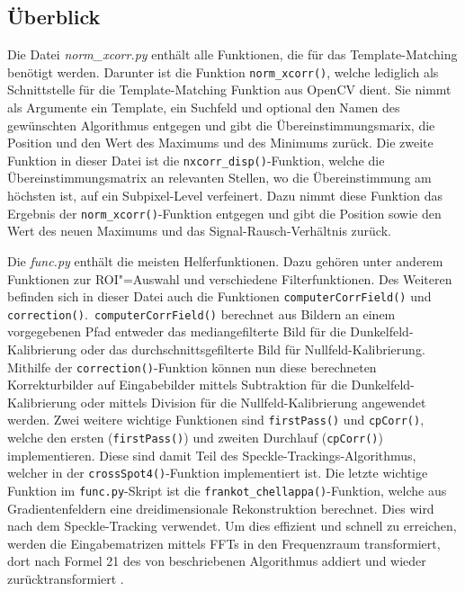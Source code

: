 \subsection{Überblick}

\begin{sloppypar}
	Die Datei \textit{norm\_xcorr.py} enthält alle Funktionen, die für das Template-Matching benötigt werden. Darunter ist die Funktion \texttt{norm\_xcorr()}, welche lediglich als Schnittstelle für die Template-Matching Funktion aus OpenCV dient. Sie nimmt als Argumente ein Template, ein Suchfeld und optional den Namen des gewünschten Algorithmus entgegen und gibt die Übereinstimmungsmarix, die Position und den Wert des Maximums und des Minimums zurück. Die zweite Funktion in dieser Datei ist die \texttt{nxcorr\_disp()}-Funktion, welche die Übereinstimmungsmatrix an relevanten Stellen, wo die Übereinstimmung am höchsten ist, auf ein Subpixel-Level verfeinert. Dazu nimmt diese Funktion das Ergebnis der \texttt{norm\_xcorr()}-Funktion entgegen und gibt die Position sowie den Wert des neuen Maximums und das Signal-Rausch-Verhältnis zurück. 
\end{sloppypar}

Die \textit{func.py} enthält die meisten Helferfunktionen. Dazu gehören unter anderem Funktionen zur \gls{ROI}"=Auswahl und verschiedene Filterfunktionen. Des Weiteren befinden sich in dieser Datei auch die Funktionen \texttt{computerCorrField()} und \texttt{correction()}.\texttt{ computerCorrField()} berechnet aus Bildern an einem vorgegebenen Pfad entweder das mediangefilterte Bild für die Dunkelfeld-Kalibrierung oder das durchschnittsgefilterte Bild für Nullfeld-Kalibrierung. Mithilfe der \texttt{correction()}-Funktion können nun diese berechneten Korrekturbilder auf Eingabebilder mittels Subtraktion für die Dunkelfeld-Kalibrierung oder mittels Division für die Nullfeld-Kalibrierung angewendet werden. Zwei weitere wichtige Funktionen sind \texttt{firstPass()} und \texttt{cpCorr()}, welche den ersten (\texttt{firstPass()}) und zweiten Durchlauf (\texttt{cpCorr()}) implementieren. Diese sind damit Teil des Speckle-Trackings-Algorithmus, welcher in der \texttt{crossSpot4()}-Funktion implementiert ist. Die letzte wichtige Funktion im \texttt{func.py}-Skript ist die \texttt{frankot\_chellappa()}-Funktion, welche aus Gradientenfeldern eine dreidimensionale Rekonstruktion berechnet. Dies wird nach dem Speckle-Tracking verwendet. Um dies effizient und schnell zu erreichen, werden die Eingabematrizen mittels \glspl{FFT} in den Frequenzraum transformiert, dort nach Formel 21 des von \citeauthor{FC88} beschriebenen Algorithmus addiert und wieder zurücktransformiert . 

